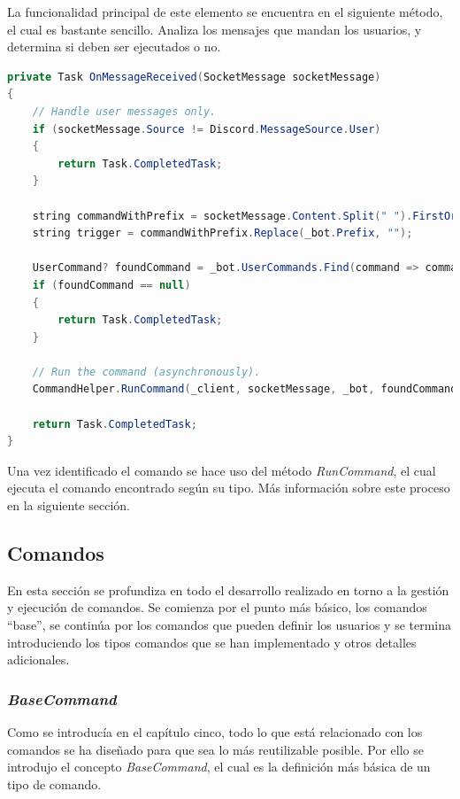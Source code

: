 La funcionalidad principal de este elemento se encuentra en el siguiente método, el cual es bastante sencillo. Analiza los mensajes que mandan los usuarios, y determina si deben ser ejecutados o no.

\begin{lstlisting}[language=java]
private Task OnMessageReceived(SocketMessage socketMessage)
{
    // Handle user messages only.
    if (socketMessage.Source != Discord.MessageSource.User)
    {
        return Task.CompletedTask;
    }

    string commandWithPrefix = socketMessage.Content.Split(" ").FirstOrDefault() ?? "";
    string trigger = commandWithPrefix.Replace(_bot.Prefix, "");

    UserCommand? foundCommand = _bot.UserCommands.Find(command => command.Trigger.Equals(trigger));
    if (foundCommand == null)
    {
        return Task.CompletedTask;
    }

    // Run the command (asynchronously).
    CommandHelper.RunCommand(_client, socketMessage, _bot, foundCommand);

    return Task.CompletedTask;
}
\end{lstlisting}

Una vez identificado el comando se hace uso del método \textit{RunCommand}, el cual ejecuta el comando encontrado según su tipo. Más información sobre este proceso en la siguiente sección.





\subsection{Comandos}

En esta sección se profundiza en todo el desarrollo realizado en torno a la gestión y ejecución de comandos. Se comienza por el punto más básico, los comandos ``base'', se continúa por los comandos que pueden definir los usuarios y se termina introduciendo los tipos comandos que se han implementado y otros detalles adicionales.

\subsubsection{\textit{BaseCommand}}

Como se introducía en el capítulo cinco, todo lo que está relacionado con los comandos se ha diseñado para que sea lo más reutilizable posible. Por ello se introdujo el concepto \textit{BaseCommand}, el cual es la definición más básica de un tipo de comando.

